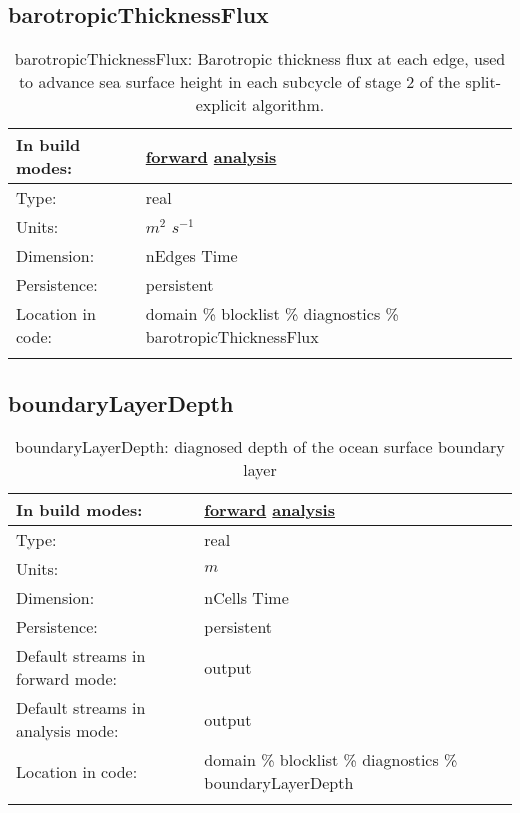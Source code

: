 \subsection[barotropicThicknessFlux]{barotropicThicknessFlux}
\label{subsec:var_sec_diagnostics_barotropicThicknessFlux}
\begin{center}
\begin{longtable}{| p{2.0in} | p{4.0in} |}
        \hline 
        In build modes: & \hyperref[subsec:forward_var_tab_diagnostics]{forward} \hyperref[subsec:analysis_var_tab_diagnostics]{analysis} \\
        \hline 
        Type: & real \\
        \hline 
        Units: & $m^2$ $s^{-1}$ \\
        \hline 
        Dimension: & nEdges Time \\
        \hline 
        Persistence: & persistent \\
        \hline 
		 Location in code: & domain \% blocklist \% diagnostics \% barotropicThicknessFlux \\
		 \hline 
    \caption{barotropicThicknessFlux: Barotropic thickness flux at each edge, used to advance sea surface height in each subcycle of stage 2 of the split-explicit algorithm.}
\end{longtable}
\end{center}
\subsection[boundaryLayerDepth]{boundaryLayerDepth}
\label{subsec:var_sec_diagnostics_boundaryLayerDepth}
\begin{center}
\begin{longtable}{| p{2.0in} | p{4.0in} |}
        \hline 
        In build modes: & \hyperref[subsec:forward_var_tab_diagnostics]{forward} \hyperref[subsec:analysis_var_tab_diagnostics]{analysis} \\
        \hline 
        Type: & real \\
        \hline 
        Units: & $m$ \\
        \hline 
        Dimension: & nCells Time \\
        \hline 
        Persistence: & persistent \\
        \hline 
		 Default streams in forward mode: &  output \\
        \hline 
		 Default streams in analysis mode: &  output \\
        \hline 
		 Location in code: & domain \% blocklist \% diagnostics \% boundaryLayerDepth \\
		 \hline 
    \caption{boundaryLayerDepth: diagnosed depth of the ocean surface boundary layer}
\end{longtable}
\end{center}
